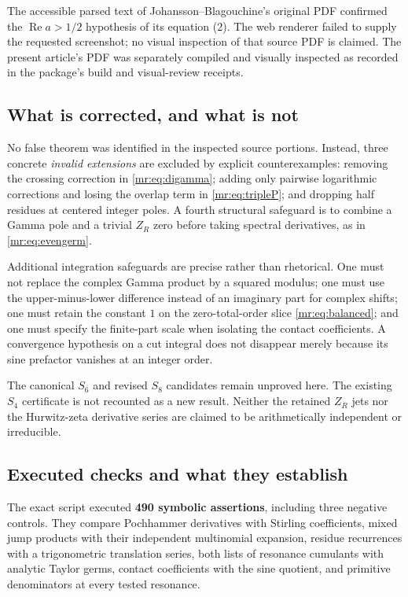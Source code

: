 \documentclass[11pt,letterpaper]{article}
\theoremstyle{definition}\newtheorem{definition}[theorem]{Definition}
\theoremstyle{remark}\newtheorem{remark}[theorem]{Remark}
\newcommand{\Rea}{\operatorname{Re}}\newcommand{\Ima}{\operatorname{Im}}
\begin{document}
The accessible parsed text of Johansson--Blagouchine's original PDF
confirmed the $\Rea a>1/2$ hypothesis of its equation (2).
The web renderer failed to supply the requested screenshot; no visual
inspection of that source PDF is claimed. The present article's PDF
was separately compiled and visually inspected as recorded in the
package's build and visual-review receipts.

\subsection{What is corrected, and what is not}
No false theorem was identified in the inspected source portions.
Instead, three concrete \emph{invalid extensions} are excluded by
explicit counterexamples: removing the crossing correction in
\eqref{mr:eq:digamma}; adding only pairwise logarithmic corrections
and losing the overlap term in \eqref{mr:eq:tripleP}; and dropping
half residues at centered integer poles. A fourth structural safeguard
is to combine a Gamma pole and a trivial $Z_R$ zero before taking
spectral derivatives, as in \eqref{mr:eq:evengerm}.

Additional integration safeguards are precise rather than rhetorical.
One must not replace the complex Gamma product by a squared modulus;
one must use the upper-minus-lower difference instead of an imaginary
part for complex shifts; one must retain the constant $1$ on the
zero-total-order slice \eqref{mr:eq:balanced}; and one must specify the
finite-part scale when isolating the contact coefficients.
A convergence hypothesis on a cut integral does not disappear merely
because its sine prefactor vanishes at an integer order.

The canonical $S_6$ and revised $S_8$ candidates remain unproved here.
The existing $S_4$ certificate is not recounted as a new result.
Neither the retained $Z_R$ jets nor the Hurwitz-zeta derivative series
are claimed to be arithmetically independent or irreducible.

\subsection{Executed checks and what they establish}
The exact script executed \textbf{490 symbolic assertions}, including
three negative controls. They compare Pochhammer derivatives with
Stirling coefficients, mixed jump products with their independent
multinomial expansion, residue recurrences with a trigonometric
translation series, both lists of resonance cumulants with analytic
Taylor germs, contact coefficients with the sine quotient, and
primitive denominators at every tested resonance.
\end{document}
